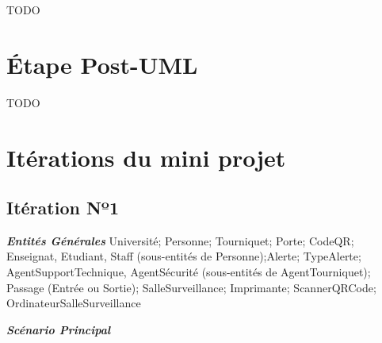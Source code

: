 

TODO
\section{Étape Post-UML}
    TODO
\section{Itérations du mini projet}
    \subsection{Itération Nº1}

        \textbf{\textit{Entités Générales}}
        \vspace{8px}
        \linebreak
        Université; Personne; Tourniquet; Porte; CodeQR;
        Enseignat, Etudiant, Staff (sous-entités de Personne);Alerte; TypeAlerte; AgentSupportTechnique, AgentSécurité (sous-entités de AgentTourniquet); Passage (Entrée ou Sortie); SalleSurveillance; Imprimante; ScannerQRCode; OrdinateurSalleSurveillance
        \linebreak

        \textbf{\textit{Scénario Principal}}
        \vspace{8px}


